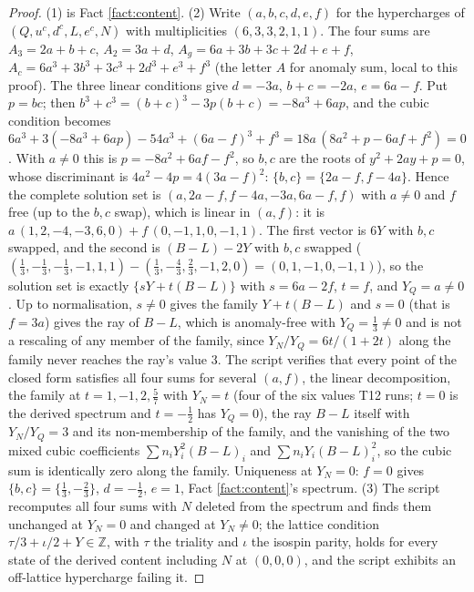 \documentclass[11pt]{article}
\theoremstyle{definition}
\begin{document}
\begin{proof}
(1) is Fact \ref{fact:content}. (2) Write $(a, b, c, d, e, f)$ for the hypercharges of $(Q, u^{c}, d^{c}, L, e^{c}, N)$ with multiplicities $(6, 3, 3, 2, 1, 1)$. The four sums are $A_{3} = 2a + b + c$, $A_{2} = 3a + d$, $A_{g} = 6a + 3b + 3c + 2d + e + f$, $A_{c} = 6a^{3} + 3b^{3} + 3c^{3} + 2d^{3} + e^{3} + f^{3}$ (the letter $A$ for anomaly sum, local to this proof). The three linear conditions give $d = -3a$, $b + c = -2a$, $e = 6a - f$. Put $p = bc$; then $b^{3} + c^{3} = (b + c)^{3} - 3p(b + c) = -8a^{3} + 6ap$, and the cubic condition becomes $6a^{3} + 3(-8a^{3} + 6ap) - 54a^{3} + (6a - f)^{3} + f^{3} = 18a\,(8a^{2} + p - 6af + f^{2}) = 0$. With $a \neq 0$ this is $p = -8a^{2} + 6af - f^{2}$, so $b, c$ are the roots of $y^{2} + 2ay + p = 0$, whose discriminant is $4a^{2} - 4p = 4(3a - f)^{2}$: $\{b, c\} = \{2a - f, f - 4a\}$. Hence the complete solution set is $(a, 2a - f, f - 4a, -3a, 6a - f, f)$ with $a \neq 0$ and $f$ free (up to the $b, c$ swap), which is linear in $(a, f)$: it is $a\,(1, 2, -4, -3, 6, 0) + f\,(0, -1, 1, 0, -1, 1)$. The first vector is $6Y$ with $b, c$ swapped, and the second is $(B - L) - 2Y$ with $b, c$ swapped ($(\tfrac13, -\tfrac13, -\tfrac13, -1, 1, 1) - (\tfrac13, -\tfrac43, \tfrac23, -1, 2, 0) = (0, 1, -1, 0, -1, 1)$), so the solution set is exactly $\{sY + t(B - L)\}$ with $s = 6a - 2f$, $t = f$, and $Y_{Q} = a \neq 0$. Up to normalisation, $s \neq 0$ gives the family $Y + t(B - L)$ and $s = 0$ (that is $f = 3a$) gives the ray of $B - L$, which is anomaly-free with $Y_{Q} = \tfrac13 \neq 0$ and is not a rescaling of any member of the family, since $Y_{N}/Y_{Q} = 6t/(1 + 2t)$ along the family never reaches the ray's value $3$. The script verifies that every point of the closed form satisfies all four sums for several $(a, f)$, the linear decomposition, the family at $t = 1, -1, 2, \tfrac57$ with $Y_{N} = t$ (four of the six values T12 runs; $t = 0$ is the derived spectrum and $t = -\tfrac12$ has $Y_{Q} = 0$), the ray $B - L$ itself with $Y_{N}/Y_{Q} = 3$ and its non-membership of the family, and the vanishing of the two mixed cubic coefficients $\sum n_{i}Y_{i}^{2}(B - L)_{i}$ and $\sum n_{i}Y_{i}(B - L)_{i}^{2}$, so the cubic sum is identically zero along the family. Uniqueness at $Y_{N} = 0$: $f = 0$ gives $\{b, c\} = \{\tfrac13, -\tfrac23\}$, $d = -\tfrac12$, $e = 1$, Fact \ref{fact:content}'s spectrum. (3) The script recomputes all four sums with $N$ deleted from the spectrum and finds them unchanged at $Y_{N} = 0$ and changed at $Y_{N} \neq 0$; the lattice condition $\tau/3 + \iota/2 + Y \in \mathbb{Z}$, with $\tau$ the triality and $\iota$ the isospin parity, holds for every state of the derived content including $N$ at $(0, 0, 0)$, and the script exhibits an off-lattice hypercharge failing it.
\end{proof}
\end{document}
